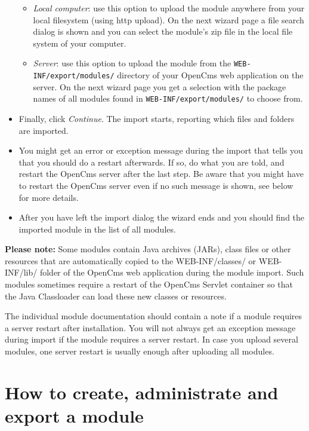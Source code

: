 \begin{itemize}
\begin{itemize}

\item {\em Local computer}: use this option to upload the module anywhere from your local filesystem 
(using http upload). On the next wizard page a file search dialog is shown and you can select the 
module's zip file in the local file system of your computer. 

\item {\em Server}: use this option to upload the module from the {\tt WEB-INF/export/modules/} directory of 
your OpenCms web application on the server.
On the next wizard page you get a selection with the package names of all modules found in 
{\tt WEB-INF/export/modules/} to choose from. 

\end{itemize}

\item Finally, click {\em Continue}. The import starts, reporting which files and folders are imported.

\item You might get an error or exception message during the import that tells you that you should do a 
restart afterwards. If so, do what you are told, and restart the OpenCms server after the last step. Be 
aware that you might have to restart the OpenCms server even if no such message is shown, see below for 
more details.

\item After you have left the import dialog the wizard ends and you should find the imported module in 
the list of all modules. 

\end{itemize}

{\bf Please note:} Some modules contain Java archives (JARs), class files or other resources that are automatically 
copied to the WEB-INF/classes/ or WEB-INF/lib/ folder of the OpenCms web application during the module import. 
Such modules sometimes require a restart of the OpenCms Servlet container so that the Java Classloader can 
load these new classes or resources.

The individual module documentation should contain a note if a module requires a server restart after 
installation. You will not always get an exception message during import if the module requires a server 
restart. In case you upload several modules, one server restart is usually enough after uploading all modules.

\section{How to create, administrate and export a module}

